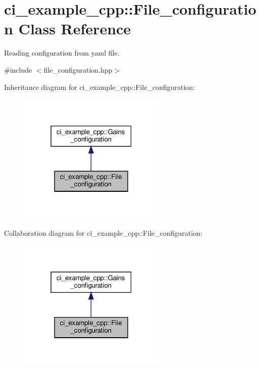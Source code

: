 \hypertarget{classci__example__cpp_1_1File__configuration}{}\section{ci\+\_\+example\+\_\+cpp\+:\+:File\+\_\+configuration Class Reference}
\label{classci__example__cpp_1_1File__configuration}


Reading configuration from yaml file.  




{\ttfamily \#include $<$file\+\_\+configuration.\+hpp$>$}



Inheritance diagram for ci\+\_\+example\+\_\+cpp\+:\+:File\+\_\+configuration\+:
\nopagebreak
\begin{figure}[H]
\begin{center}
\leavevmode
\includegraphics[width=199pt]{classci__example__cpp_1_1File__configuration__inherit__graph}
\end{center}
\end{figure}


Collaboration diagram for ci\+\_\+example\+\_\+cpp\+:\+:File\+\_\+configuration\+:
\nopagebreak
\begin{figure}[H]
\begin{center}
\leavevmode
\includegraphics[width=199pt]{classci__example__cpp_1_1File__configuration__coll__graph}
\end{center}
\end{figure}
